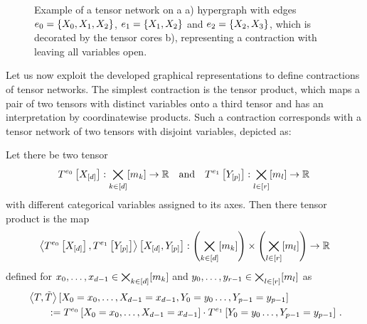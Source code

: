 \begin{figure}
	\begin{center}
		
	\end{center}
	\caption{
	Example of a tensor network on a
	a) hypergraph with edges $e_0=\{X_{0},X_{1},X_{2}\}$, $e_1=\{X_{1},X_{2}\}$ and $e_2=\{X_{2},X_{3}\}$,
	which is decorated by the tensor cores b), representing a contraction with leaving all variables open.
	}\label{fig:network}
\end{figure}






Let us now exploit the developed graphical representations to define contractions of tensor networks.
The simplest contraction is the tensor product, which maps a pair of two tensors with distinct variables onto a third tensor and has an interpretation by coordinatewise products.
Such a contraction corresponds with a tensor network of two tensors with disjoint variables, depicted as:
\begin{center}
	
\end{center}

\begin{definition}\label{def:tensorProduct}
	Let there be two tensor
	\begin{align*}
		T^{e_0}\left[X_{[d]}\right] : \bigtimes_{k\in[d]}[m_{k}] \rightarrow \mathbb{R} \quad \text{and} \quad  T^{e_1}\left[Y_{[p]}\right] : \bigtimes_{l\in[r]}[m_{l}] \rightarrow \mathbb{R} \,
	\end{align*}
	with different categorical variables assigned to its axes.
	Then there tensor product is the map
	\begin{align*}
		\left\langle T^{e_0}\left[X_{[d]}\right],T^{e_1}\left[Y_{[p]}\right]\right\rangle \left[ X_{[d]},Y_{[p]} \right] :  \left(\bigtimes_{k\in[d]}[m_{k}]\right) \times \left(\bigtimes_{l\in[r]}[m_{l}]\right) \rightarrow \mathbb{R}
	\end{align*}
	defined for $x_{0},\ldots,x_{d-1}\in\bigtimes_{k\in[d]}[m_{k}]$ and ${y_{0},\ldots,y_{r-1}}\in\bigtimes_{l\in[r]}[m_{l}]$ as
	\begin{align*}
		& \left\langle T,\tilde{T}\right\rangle \left[ X_{0}=x_{0},\ldots,X_{d-1}=x_{d-1},Y_{0}=y_{0}\ldots,Y_{p-1}=y_{p-1} \right] \\
		&\quad\quad :=  T^{e_0}\left[X_{0}=x_{0},\ldots,X_{d-1}=x_{d-1}\right]\cdot T^{e_1}\left[Y_{0}=y_{0}\ldots,Y_{p-1}=y_{p-1}\right] \, .
	\end{align*}
\end{definition}

